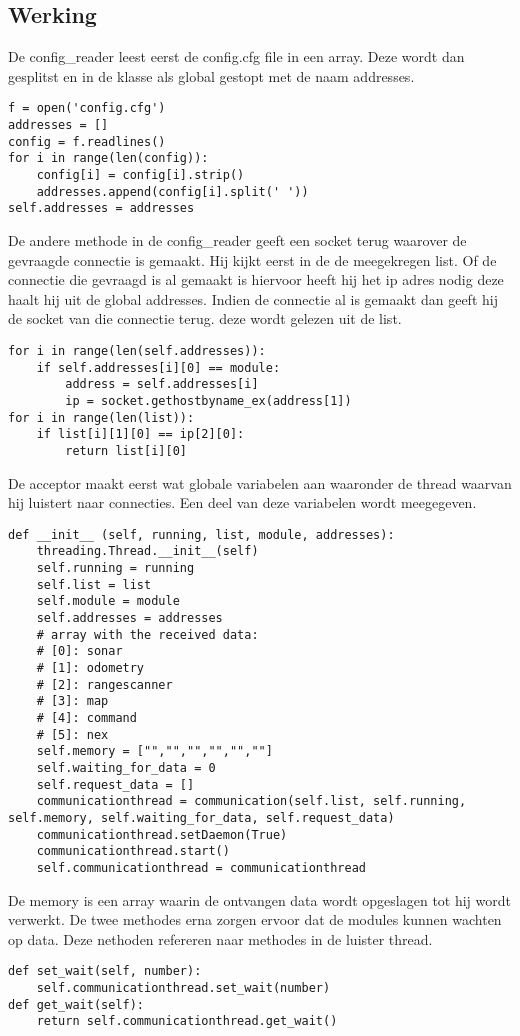 \documentclass[a4paper,10pt]{article}
\begin{document}
\subsection{Werking}
De config_reader leest eerst de config.cfg file in een array. Deze wordt dan gesplitst en in de klasse als global gestopt met de naam addresses.
\begin{verbatim}
f = open('config.cfg')
addresses = []
config = f.readlines()
for i in range(len(config)):
    config[i] = config[i].strip()
    addresses.append(config[i].split(' '))
self.addresses = addresses
\end{verbatim}
De andere methode in de config_reader geeft een socket terug waarover de gevraagde connectie is gemaakt. Hij kijkt eerst in de de meegekregen list. Of de connectie die gevraagd is al gemaakt is hiervoor heeft hij het ip adres nodig deze haalt hij uit de global addresses. Indien de connectie al is gemaakt dan geeft hij de socket van die connectie terug. deze wordt gelezen uit de list.
\begin{verbatim}
for i in range(len(self.addresses)):
    if self.addresses[i][0] == module:
        address = self.addresses[i]
        ip = socket.gethostbyname_ex(address[1])
for i in range(len(list)):
    if list[i][1][0] == ip[2][0]:
        return list[i][0]
\end{verbatim}
De acceptor maakt eerst wat globale variabelen aan waaronder de thread waarvan hij luistert naar connecties. Een deel van deze variabelen wordt meegegeven.
\begin{verbatim}
def __init__ (self, running, list, module, addresses):
    threading.Thread.__init__(self)
    self.running = running
    self.list = list
    self.module = module
    self.addresses = addresses
    # array with the received data:
    # [0]: sonar
    # [1]: odometry
    # [2]: rangescanner
    # [3]: map
    # [4]: command
    # [5]: nex        
    self.memory = ["","","","","",""]
    self.waiting_for_data = 0
    self.request_data = []
    communicationthread = communication(self.list, self.running, self.memory, self.waiting_for_data, self.request_data)
    communicationthread.setDaemon(True)
    communicationthread.start()
    self.communicationthread = communicationthread
\end{verbatim}
De memory is een array waarin de ontvangen data wordt opgeslagen tot hij wordt verwerkt.
De twee methodes erna zorgen ervoor dat de modules kunnen wachten op data. Deze nethoden refereren naar methodes in de luister thread.
\begin{verbatim}
def set_wait(self, number):
    self.communicationthread.set_wait(number)
def get_wait(self):
    return self.communicationthread.get_wait()
\end{verbatim}
\end{document}
